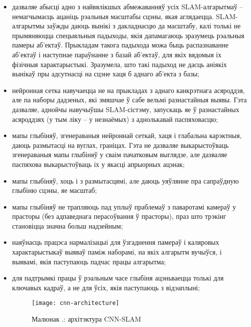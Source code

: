 \begin{itemize}
    \item дазваляе абысці адно з найвялікшых абмежаванняў усіх SLAM-алгарытмаў --
    немагчымасць ацаніць рэальныя масштабы сцэны, якая аглядаецца. SLAM-алгарытмы
    заўжды даюць вынікі з дакладнасцю да масштабу, калі толькі не прымяняюцца спецыяльныя падыходы,
    якія дапамагаюць зразумець рэальныя памеры аб'ектаў. Прыкладам такога падыхода
    можа быць распазнаванне аб'ектаў і наступнае параўнанне з базай аб'ектаў,
    для якіх вядомыя іх фізічныя характарыстыкі. Зразумела, што такі падыход не дасць аніякіх
    вынікаў пры адсутнасці на сцэне хаця б аднаго аб'екта з базы;
    \item нейронная сетка навучаецца не на прыкладах з аднаго канкрэтнага асяроддзя,
    але па наборы дадзеных, які змяшчае ў сабе вельмі разнастайныя выявы. Гэта дазваляе,
    аднойчы навучыўшы SLAM-сістэму, запускаць яе ў разнастайных асяроддзях (у тым ліку --
    у незнаёмых) з аднолькавай паспяховасцю;
    \item мапы глыбіняў, згенераваныя нейроннай сеткай, хаця і глабальна карэктныя,
    даюць размытасці на вуглах, граніцах. Гэта не дазваляе выкарыстоўваць згенераваныя
    мапы глыбіняў у сваім пачатковым выглядзе, але дазваляе паспяхова выкарыстоўваць іх
    у якасці апрыорных ацэнак;
    \item мапы глыбіняў, хоць і з размытасцямі, але даюць уяўлянне пра сапраўдную
    глыбіню сцэны, яе масштаб;
    \item мапы глыбіняў не трапляюць пад уплыў праблемаў з паваротамі камераў у прасторы
    (без адпаведнага перасоўвання ў прасторы), праз што трэкінг становіцца значна больш надзейным;
    \item наяўнасць працэса нармалізацыі для ўзгаднення памераў і каляровых характарыстыкаў
    выяваў паміж наборамі, на якіх алгарытм вучыўся, і выявамі, якія паступаюць падчас працы алгарытма;
    \item для падтрымкі працы ў рэальным часе глыбіня ацэньваецца толькі для ключавых кадраў,
    а не для ўсіх, якія паступаюць з відэаплыні;

    \begin{figure}[H]
      \centering
      \texttt{[image: cnn-architecture]}
      \captionsetup{labelformat=empty}
      \caption{Малюнак \cursection.: архітэктура CNN-SLAM}
      \label{fig:cnn-architecture}
    \end{figure}


\end{itemize}

